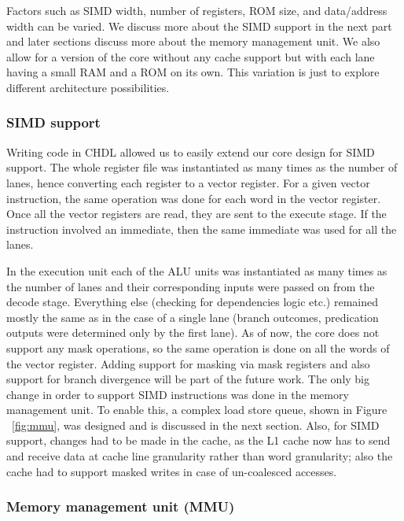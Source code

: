 Factors such as SIMD width, number of registers, ROM size, and data/address width can be varied. We discuss more about the SIMD support in the next part and later sections discuss more about the memory management unit. We also allow for a version of the core without any cache support but with each lane having a small RAM and a ROM on its own. This variation is just to explore different architecture possibilities.

\subsubsection {SIMD support}

Writing code in CHDL allowed us to easily extend our core design for SIMD support. The whole register file was instantiated as many times as the number of lanes, hence converting each register to a vector register. For a given vector instruction, the same operation was done for each word in the vector register. Once all the vector registers are read, they are sent to the execute stage. If the instruction involved an immediate, then the same immediate was used for all the lanes.

In the execution unit each of the ALU units was instantiated as many times as the number of lanes and their corresponding inputs were passed on from the decode stage. Everything else (checking for dependencies logic etc.) remained mostly the same as in the case of a single lane (branch outcomes, predication outputs were determined only by the first lane). As of now, the core does not support any mask operations, so the same operation is done on all the words of the vector register. Adding support for masking via mask registers and also support for branch divergence will be part of the future work. The only big change in order to support SIMD instructions was done in the memory management unit. To enable this, a complex load store queue, shown in Figure ~\ref{fig:mmu}, was designed and is discussed in the next section. Also, for SIMD support, changes had to be made in the cache, as the L1 cache now has to send and receive data at cache line granularity rather than word granularity; also the cache had to support masked writes in case of un-coalesced accesses.

\subsubsection {Memory management unit (MMU)}

